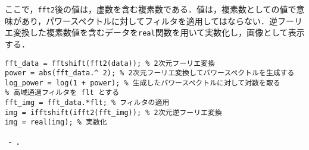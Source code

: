 ここで，\texttt{fft2}後の値は，虚数を含む複素数である．値は，複素数としての値で意味があり，パワースペクトルに対してフィルタを適用してはならない．逆フーリエ変換した複素数値を含むデータを\texttt{real}関数を用いて実数化し，画像として表示する．
\begin{lstlisting}[caption={2次元フーリエ変換と高域通過フィルタ},label={src:2次元フーリエ変換と高域通過フィルタ}]
% 画像データを data とする
fft_data = fftshift(fft2(data)); % 2次元フーリエ変換
power = abs(fft_data.^ 2); % 2次元フーリエ変換してパワースペクトルを生成する
log_power = log(1 + power); % 生成したパワースペクトルに対して対数を取る
% 高域通過フィルタを flt とする
fft_img = fft_data.*flt; % フィルタの適用
img = ifftshift(ifft2(fft_img)); % 2次元逆フーリエ変換
img = real(img); % 実数化
	\end{lstlisting}
\ -\ ．